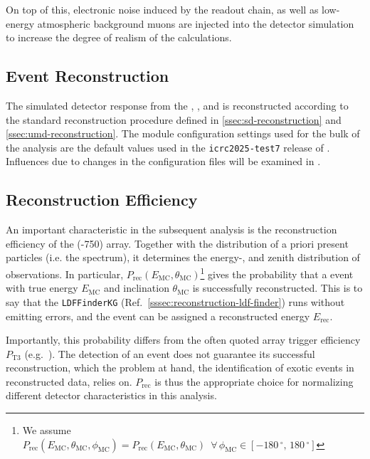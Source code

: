 On top of this, electronic noise induced by the \DAQ readout chain, as well as 
low-energy atmospheric background muons are injected into the detector 
simulation to increase the degree of realism of the calculations.

\subsection{Event Reconstruction}

The simulated detector response from the \WCD, \SSD, and \UMD is reconstructed 
according to the standard reconstruction procedure defined in 
\cref{ssec:sd-reconstruction} and \cref{ssec:umd-reconstruction}. The module 
configuration settings used for the bulk of the analysis are the default values 
used in the \texttt{icrc2025-test7} release of \Offline 
\cite{Icrc2025test7Release2025}. Influences due to changes in the configuration 
files will be examined in .

\subsection{Reconstruction Efficiency}

An important characteristic in the subsequent analysis is the reconstruction 
efficiency of the \SD(-750) array. Together with the distribution of a priori 
present \CR particles (i.e. the \CR spectrum), it determines the energy-, and 
zenith distribution of \CR observations. In particular, 
$P_\mathrm{rec}(E_\mathrm{MC}, \theta_\mathrm{MC})$\footnote{We assume 
$P_\mathrm{rec}(E_\mathrm{MC}, \theta_\mathrm{MC}, \phi_\mathrm{MC}) = 
P_\mathrm{rec}(E_\mathrm{MC}, \theta_\mathrm{MC})\,\,\,\forall\,\phi_\mathrm{MC}
\in [-180\,^\circ,\,180\,^\circ]$} gives the probability that a \CR event with 
true energy $E_\mathrm{MC}$ and inclination $\theta_\mathrm{MC}$ is successfully
reconstructed. This is to say that the \texttt{LDFFinderKG} 
(Ref.~\cref{sssec:reconstruction-ldf-finder}) runs without emitting errors, and 
the event can be assigned a reconstructed energy $E_\mathrm{rec}$. 

Importantly, this probability differs from the often quoted array trigger 
efficiency $P_\mathrm{T3}$ 
(e.g.~\cite[Fig.~7]{abrahamTriggerApertureSurface2010}). The detection of an 
event does not guarantee its successful reconstruction, which the problem at 
hand, the identification of exotic events in reconstructed data, relies on. 
$P_\mathrm{rec}$ is thus the appropriate choice for normalizing different 
detector characteristics in this analysis.

